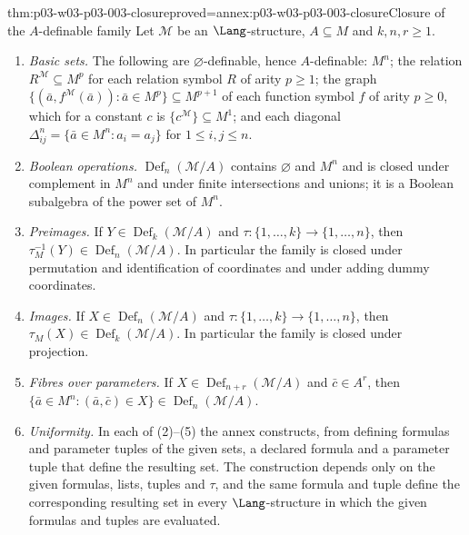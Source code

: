 \begin{hbtheorem}{thm:p03-w03-p03-003-closure}{proved=annex:p03-w03-p03-003-closure}{Closure of the \(A\)-definable family}
Let \(\mathcal M\) be an \(\Lang\)-structure, \(A\subseteq M\) and
\(k,n,r\geq1\).
\begin{enumerate}
 \item \emph{Basic sets.}  The following are \(\varnothing\)-definable, hence
       \(A\)-definable: \(M^n\); the relation \(R^{\mathcal M}\subseteq M^p\)
       for each relation symbol \(R\) of arity \(p\geq1\); the graph
       \(\{(\bar a,f^{\mathcal M}(\bar a)):\bar a\in M^p\}\subseteq M^{p+1}\)
       of each function symbol \(f\) of arity \(p\geq0\), which for a
       constant \(c\) is \(\{c^{\mathcal M}\}\subseteq M^1\); and each
       diagonal \(\Delta^n_{ij}=\{\bar a\in M^n:a_i=a_j\}\) for
       \(1\leq i,j\leq n\).
 \item \emph{Boolean operations.}  \(\operatorname{Def}_n(\mathcal M/A)\)
       contains \(\varnothing\) and \(M^n\) and is closed under complement
       in \(M^n\) and under finite intersections and unions; it is a Boolean
       subalgebra of the power set of \(M^n\).
 \item \emph{Preimages.}  If \(Y\in\operatorname{Def}_k(\mathcal M/A)\) and
       \(\tau:\{1,\ldots,k\}\to\{1,\ldots,n\}\), then
       \(\tau_M^{-1}(Y)\in\operatorname{Def}_n(\mathcal M/A)\).  In
       particular the family is closed under permutation and identification
       of coordinates and under adding dummy coordinates.
 \item \emph{Images.}  If \(X\in\operatorname{Def}_n(\mathcal M/A)\) and
       \(\tau:\{1,\ldots,k\}\to\{1,\ldots,n\}\), then
       \(\tau_M(X)\in\operatorname{Def}_k(\mathcal M/A)\).  In particular the
       family is closed under projection.
 \item \emph{Fibres over parameters.}  If
       \(X\in\operatorname{Def}_{n+r}(\mathcal M/A)\) and
       \(\bar c\in A^r\), then
       \(\{\bar a\in M^n:(\bar a,\bar c)\in X\}
       \in\operatorname{Def}_n(\mathcal M/A)\).
 \item \emph{Uniformity.}  In each of (2)--(5) the annex constructs, from
       defining formulas and parameter tuples of the given sets, a declared
       formula and a parameter tuple that define the resulting set.  The
       construction depends only on the given formulas, lists, tuples and
       \(\tau\), and the same formula and tuple define the corresponding
       resulting set in every \(\Lang\)-structure in which the given
       formulas and tuples are evaluated.
\end{enumerate}
\end{hbtheorem}


